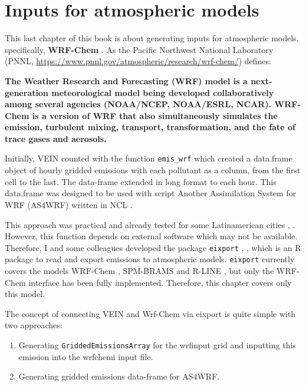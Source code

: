 \documentclass[12pt,graybox,envcountchap,sectrefs]{krantz}
\providecommand{\tightlist}{%
  \setlength{\itemsep}{0pt}\setlength{\parskip}{0pt}}
\theoremstyle{definition}
\theoremstyle{definition}
\theoremstyle{definition}
\theoremstyle{remark}
\begin{document}
\chapter{Inputs for atmospheric models}\label{ep}

This last chapter of this book is about generating inputs for
atmospheric models, specifically, \textbf{WRF-Chem}
\citep{Grelletal2005}. As the Pacific Northwest National Laboratory
(PNNL, \url{https://www.pnnl.gov/atmospheric/research/wrf-chem/})
defines:

\textbf{The Weather Research and Forecasting (WRF) model is a
next-generation meteorological model being developed collaboratively
among several agencies (NOAA/NCEP, NOAA/ESRL, NCAR). WRF-Chem is a
version of WRF that also simultaneously simulates the emission,
turbulent mixing, transport, transformation, and the fate of trace gases
and aerosols.}

Initially, VEIN counted with the function \texttt{emis\_wrf} which
created a data.frame object of hourly gridded emissions with each
pollutant as a column, from the first cell to the last. The data-frame
extended in long format to each hour. This data.frame was designed to be
used with script Another Assimilation System for WRF (AS4WRF)
\citep{VaraVelaetal2015} written in NCL \citep{ncl}.

This approach was practical and already tested for some Latinamerican
cities \citep{micro}, \citep{icshmo}. However, this function depends on
external software which may not be available. Therefore, I and some
colleagues developed the package \texttt{eixport} \citep{eixport},
\citep{eixport2}, which is an R package to read and export emissions to
atmospheric models. \texttt{eixport} currently covers the models
WRF-Chem \citep{Grelletal2005}, SPM-BRAMS \citep{Freitasetal2005} and
R-LINE \citep{rline}, but only the WRF-Chem interface has been fully
implemented. Therefore, this chapter covers only this model.

The concept of connecting VEIN and Wrf-Chem via eixport is quite simple
with two approaches:

\begin{enumerate}
\def\labelenumi{\arabic{enumi}.}
\tightlist
\item
  Generating \texttt{GriddedEmissionsArray} for the wrfinput grid and
  inputting this emission into the wrfchemi input file.
\item
  Generating gridded emissions data-frame for AS4WRF.
\end{enumerate}
\end{document}
